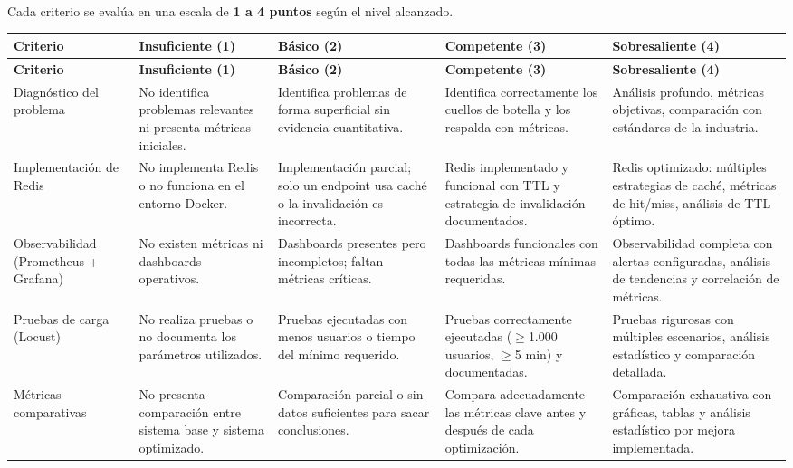 \documentclass[12pt,a4paper]{article}
\begin{document}
Cada criterio se evalúa en una escala de \textbf{1 a 4 puntos} según el nivel alcanzado.

\renewcommand{\arraystretch}{1.6}
\small

\begin{longtable}{|p{2.8cm}|p{2.9cm}|p{2.9cm}|p{2.9cm}|p{2.9cm}|}
\hline
\textbf{Criterio} &
\textbf{Insuficiente (1)} &
\textbf{Básico (2)} &
\textbf{Competente (3)} &
\textbf{Sobresaliente (4)} \\
\hline
\endfirsthead

\hline
\textbf{Criterio} &
\textbf{Insuficiente (1)} &
\textbf{Básico (2)} &
\textbf{Competente (3)} &
\textbf{Sobresaliente (4)} \\
\hline
\endhead

Diagnóstico del problema &
No identifica problemas relevantes ni presenta métricas iniciales. &
Identifica problemas de forma superficial sin evidencia cuantitativa. &
Identifica correctamente los cuellos de botella y los respalda con métricas. &
Análisis profundo, métricas objetivas, comparación con estándares de la industria. \\
\hline

Implementación de Redis &
No implementa Redis o no funciona en el entorno Docker. &
Implementación parcial; solo un endpoint usa caché o la invalidación es incorrecta. &
Redis implementado y funcional con TTL y estrategia de invalidación documentados. &
Redis optimizado: múltiples estrategias de caché, métricas de hit/miss, análisis de TTL óptimo. \\
\hline

Observabilidad (Prometheus + Grafana) &
No existen métricas ni dashboards operativos. &
Dashboards presentes pero incompletos; faltan métricas críticas. &
Dashboards funcionales con todas las métricas mínimas requeridas. &
Observabilidad completa con alertas configuradas, análisis de tendencias y correlación de métricas. \\
\hline

Pruebas de carga (Locust) &
No realiza pruebas o no documenta los parámetros utilizados. &
Pruebas ejecutadas con menos usuarios o tiempo del mínimo requerido. &
Pruebas correctamente ejecutadas ($\geq$1.000 usuarios, $\geq$5 min) y documentadas. &
Pruebas rigurosas con múltiples escenarios, análisis estadístico y comparación detallada. \\
\hline

Métricas comparativas &
No presenta comparación entre sistema base y sistema optimizado. &
Comparación parcial o sin datos suficientes para sacar conclusiones. &
Compara adecuadamente las métricas clave antes y después de cada optimización. &
Comparación exhaustiva con gráficas, tablas y análisis estadístico por mejora implementada. \\
\hline


\end{longtable}
\end{document}

